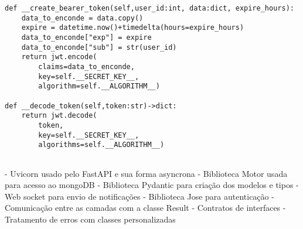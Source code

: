 \begin{verbatim}
def __create_bearer_token(self,user_id:int, data:dict, expire_hours):
    data_to_enconde = data.copy()
    expire = datetime.now()+timedelta(hours=expire_hours)
    data_to_enconde["exp"] = expire
    data_to_enconde["sub"] = str(user_id)
    return jwt.encode(
        claims=data_to_enconde,
        key=self.__SECRET_KEY__,
        algorithm=self.__ALGORITHM__)

def __decode_token(self,token:str)->dict:
    return jwt.decode(
        token,
        key=self.__SECRET_KEY__,
        algorithms=self.__ALGORITHM__)
    
\end{verbatim}






- Uvicorn usado pelo FastAPI e sua forma asyncrona
- Biblioteca Motor usada para acesso ao mongoDB
- Biblioteca Pydantic para criação dos modelos e tipos
- Web socket para envio de notificações
- Biblioteca Jose para autenticação
- Comunicação entre as camadas com a classe Result
- Contratos de interfaces
- Tratamento de erros com classes personalizadas

